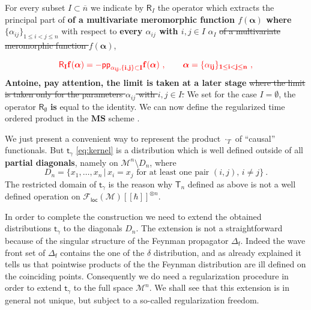 \documentclass[11pt]{book}
\newcommand{\com}[1]{{\color{red}\bf #1}}
\newcommand{\sbar}[1]{\sout{\color{red} #1}}
\newcommand{\loc}{\mathsf{loc}}
\newcommand{\pp}{\mathsf{pp}}
\newcommand{\MS}{\textbf{MS}}
\newcommand{\alphabd}{\boldsymbol{\alpha}}
\newcommand{\Mcal}{\mathcal{M}}
\newcommand{\Rsf}{\mathsf{R}}
\newcommand{\Tsf}{\mathsf{T}}
\newcommand{\fsf}{\mathsf{f}}
\newcommand{\tsf}{\mathsf{t}}
\theoremstyle{break}
\begin{document}
For every subset $I\subset \overline{n}$ we indicate by $\Rsf_I$ the operator which extracts the principal part 
of \com{of a multivariate meromorphic function $f(\alphabd)$ where $\{\alpha_{ij}\}_{1\leq i<j \leq n}$} 
with respect to \com{every $\alpha_{ij}$ with $i,j\in I$} \sbar{$\alpha_I$} \sbar{of a multivariate meromorphic function $f(\alphabd)$}, 
%


\begin{equation}
\com{\Rsf_I f(\alphabd) = - \pp_{\alpha_{ij}, \{i,j\}\subset I} f(\alphabd) \ ,
\qquad \alphabd = \{\alpha_{ij}\}_{1\leq i<j \leq n} \ , }
\label{eq:pp_op}
\end{equation}
\index{$\Rsf_I $}
%
\com{Antoine, pay attention, the limit is taken at a later stage}
\sbar{where the limit is taken only for the parameters $\alpha_{ij}$ with $i,j \in I$.} 
We set for the case $I=\emptyset$, the operator $\Rsf_\emptyset$ \com{is} equal to the identity.
We can now define the regularized time ordered product in the $\MS$ scheme \cite{duetsch_dimensional_2014}.







\bigskip


We just present a convenient way to represent the product $\cdot_T$ of ``causal'' functionals. But $\tsf_\gamma$ \eqref{eq:kernel} is a distribution which is well defined outside of all \textbf{partial diagonals}, namely on $\Mcal^n\setminus D_n$, where 
%
\begin{equation}
D_n = \{x_1,\ldots,x_n\,|\, x_i=x_j \text{ for at least one pair } (i,j),\, i\neq j \} \ .
\label{eq:all_diagonals}
\end{equation}
%
The restricted domain of $\tsf_\gamma$ is the reason why $\Tsf_n$ defined as above is not a well defined operation on $\mathcal{F}_\loc(\Mcal)[[\hbar]]^{\otimes n}$. 


In order to complete the construction we need to extend the obtained distributions $\tsf_\gamma$ to the diagonals $D_n$. The extension is not a straightforward because of the singular structure of the Feynman propagator $\Delta_\fsf$. Indeed the wave front set of $\Delta_\fsf$ contains the one of the $\delta$ distribution, and as already explained it tells us that pointwise products of the the Feynman distribution are ill defined on the coinciding points. Consequently we do need a regularization procedure in order to extend $\tsf_\gamma$ to the full space $\Mcal^n$. We shall see that this extension is in general not unique, but subject to a so-called regularization freedom.
\end{document}
